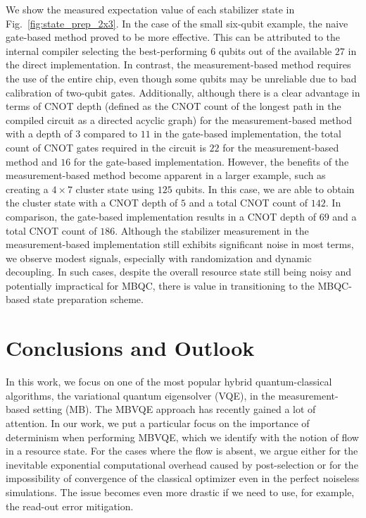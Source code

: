 \documentclass[../main.tex]{subfiles}
\begin{document}
We show the measured expectation value of each stabilizer state in Fig.~\ref{fig:state_prep_2x3}. 
In the case of the small six-qubit example, the naive gate-based method proved to be more effective. This can be attributed to the internal compiler selecting the best-performing $6$ qubits out of the available $27$ in the direct implementation. 
In contrast, the measurement-based method requires the use of the entire chip, even though some qubits may be unreliable due to bad calibration of two-qubit gates.
Additionally, although there is a clear advantage in terms of CNOT depth (defined as the CNOT count of the longest path in the compiled circuit as a directed acyclic graph) for the measurement-based method with a depth of $3$ compared to $11$ in the gate-based implementation, the total count of CNOT gates required in the circuit is $22$ for the measurement-based method and $16$ for the gate-based implementation.
However, the benefits of the measurement-based method become apparent in a larger example, such as creating a $4\times7$ cluster state using $125$ qubits. In this case, we are able to obtain the cluster state with a CNOT depth of $5$ and a total CNOT count of $142$. In comparison, the gate-based implementation results in a CNOT depth of $69$ and a total CNOT count of $186$. 
Although the stabilizer measurement in the measurement-based implementation still exhibits significant noise in most terms, we observe modest signals, especially with randomization and dynamic decoupling. In such cases, despite the overall resource state still being noisy and potentially impractical for MBQC, there is value in transitioning to the MBQC-based state preparation scheme.




\section{Conclusions and Outlook}

In this work, we focus on one of the most popular hybrid quantum-classical algorithms, the variational quantum eigensolver (VQE), in the measurement-based setting (MB). The MBVQE approach has recently gained a lot of attention. In our work, we put a particular focus on the importance of determinism when performing MBVQE, which we identify with the notion of flow in a resource state. For the cases where the flow is absent, we argue either for the inevitable exponential computational overhead caused by post-selection or for the impossibility of convergence of the classical optimizer even in the perfect noiseless simulations. The issue becomes even more drastic if we need to use, for example, the read-out error mitigation.  
\end{document}
